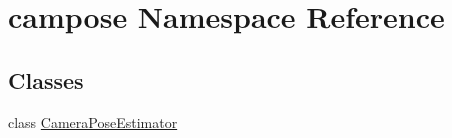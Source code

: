 \hypertarget{namespacecampose}{}\section{campose Namespace Reference}
\label{namespacecampose}
\subsection*{Classes}
\begin{DoxyCompactItemize}
\item 
class \hyperlink{classcampose_1_1CameraPoseEstimator}{Camera\+Pose\+Estimator}
\end{DoxyCompactItemize}
